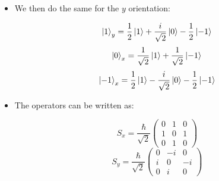 \begin{itemize}
\begin{itemize}
        \item We then do the same for the $y$ orientation:

          $$\ket{1}_y=\frac{1}{2}\ket{1}+\frac{i}{\sqrt{2}}\ket{0}-\frac{1}{2}\ket{-1}$$
          $$\ket{0}_x=\frac{1}{\sqrt{2}}\ket{1}+\frac{1}{\sqrt{2}}\ket{-1}$$
          $$\ket{-1}_x=\frac{1}{2}\ket{1}-\frac{i}{\sqrt{2}}\ket{0}-\frac{1}{2}\ket{-1}$$

        \item The operators can be written as:

          $$S_x=\frac{\hbar}{\sqrt{2}}\left( \begin{matrix} 0 & 1 & 0\\ 1 & 0 & 1\\ 0 & 1 & 0\end{matrix} \right)$$
          $$S_y=\frac{\hbar}{\sqrt{2}}\left( \begin{matrix} 0 & -i & 0\\ i & 0 & -i\\ 0 & i & 0\end{matrix} \right)$$

    \end{itemize}

\end{itemize}



